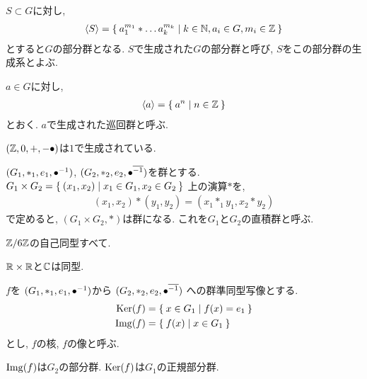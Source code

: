 \begin{definition}
  $S\subset G$に対し,
  \begin{align*}
    \Braket{S}=\Set{a_1^{m_1}\ast \dots a_k^{m_k}|k\in\mathbb{N}, a_i\in G, m_i\in \mathbb{Z}}
  \end{align*}
  とすると$G$の部分群となる.
  $S$で生成された$G$の部分群と呼び, $S$をこの部分群の生成系とよぶ.
\end{definition}
\begin{definition}
  $a\in G$に対し,
  \begin{align*}
    \Braket{a}=\Set{a^n|n\in\mathbb{Z}}
  \end{align*}
  とおく.
  $a$で生成された巡回群と呼ぶ.
\end{definition}

\begin{example}
$(\mathbb{Z},0,+,-{\bullet})$は$1$で生成されている.
\end{example}

\begin{prop}
  $(G_1,\ast_1,e_1,{\bullet}^{-1})$,
  $(G_2,\ast_2,e_2,{\bullet}^{\overline{-1}})$を群とする.
  $G_1\times G_2=\Set{(x_1,x_2)|x_1\in G_1,x_2\in G_2}$
  上の演算$\ast$を,
  \begin{align*}
    (x_1,x_2)\ast(y_1,y_2)=(x_1\ast_1y_1,x_2\ast y_2)
  \end{align*}
  で定めると, $(G_1\times G_2,\ast)$は群になる.
  これを$G_1$と$G_2$の直積群と呼ぶ.
\end{prop}

\begin{example}
  $\mathbb{Z}/6\mathbb{Z}$の自己同型すべて.
\end{example}
\begin{example}
$\mathbb{R}\times \mathbb{R}$と$\mathbb{C}$は同型.
\end{example}

\begin{definition}
  $f$を
  $(G_1,\ast_1,e_1,{\bullet}^{-1})$から
  $(G_2,\ast_2,e_2,{\bullet}^{\overline{-1}})$
  への群準同型写像とする.
  \begin{align*}
    \operatorname{Ker}(f)&=\Set{x\in G_1|f(x)=e_1}\\
    \operatorname{Img}(f)&=\Set{f(x)|x\in G_1}
  \end{align*}
  とし, $f$の核, $f$の像と呼ぶ.
\end{definition}

\begin{prop}
  $\operatorname{Img}(f)$は$G_2$の部分群.
  $\operatorname{Ker}(f)$は$G_1$の正規部分群.
\end{prop}


